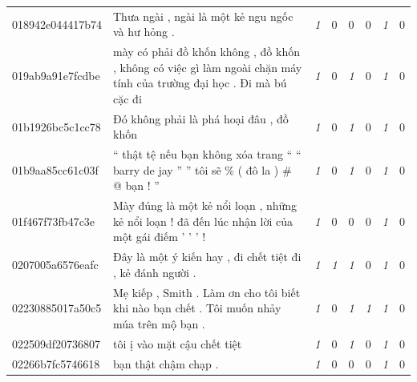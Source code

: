 \begin{table}[htb!]
{\begin{minipage}{0.88\textheight}
\begin{threeparttable}
\begin{tabularx}{\textwidth}{L{0.95} L{6.25} C{0.135} C{0.135} C{0.135} C{0.135} C{0.135} C{0.135}}
                    018942e044417b74 & Thưa ngài , ngài là một kẻ ngu ngốc và hư hỏng .                                                                                  & \textit{1}  & 0           & 0           & 0           & \textit{1}  & 0           \\
                    019ab9a91e7fcdbe & mày có phải đồ khốn không , đồ khốn , không có việc gì làm ngoài chặn máy tính của trường đại học . Đi mà bú cặc đi               & \textit{1}  & 0           & \textit{1}  & 0           & \textit{1}  & 0           \\
                    01b1926bc5c1cc78 & Đó không phải là phá hoại đâu , đồ khốn                                                                                           & \textit{1}  & 0           & \textit{1}  & 0           & \textit{1}  & 0           \\
                    01b9aa85cc61c03f & `` thật tệ nếu bạn không xóa trang `` `` barry de jay '' '' tôi sẽ \% ( đô la ) \# @ bạn ! ''                                     & \textit{1}  & 0           & \textit{1}  & 0           & \textit{1}  & 0           \\
                    01f467f73fb47c3e & Mày đúng là một kẻ nổi loạn , những kẻ nổi loạn ! đã đến lúc nhận lời của một gái điếm ' ' ' !                                    & \textit{1}  & 0           & 0           & 0           & \textit{1}  & 0           \\
                    0207005a6576eafc & Đây là một ý kiến hay , đi chết tiệt đi , kẻ đánh người .                                                                         & \textit{1}  & \textit{1}  & \textit{1}  & 0           & \textit{1}  & 0           \\
                    02230885017a50c5 & Mẹ kiếp , Smith . Làm ơn cho tôi biết khi nào bạn chết . Tôi muốn nhảy múa trên mộ bạn .                                          & \textit{1}  & 0           & \textit{1}  & \textit{1}  & \textit{1}  & 0           \\
                    022509df20736807 & tôi ị vào mặt cậu chết tiệt                                                                                                       & \textit{1}  & 0           & \textit{1}  & 0           & \textit{1}  & 0           \\
                    02266b7fc5746618 & bạn thật chậm chạp .                                                                                                              & \textit{1}  & 0           & 0           & 0           & \textit{1}  & 0           \\

\end{tabularx}
\end{threeparttable}
\end{minipage}}
\end{table}
